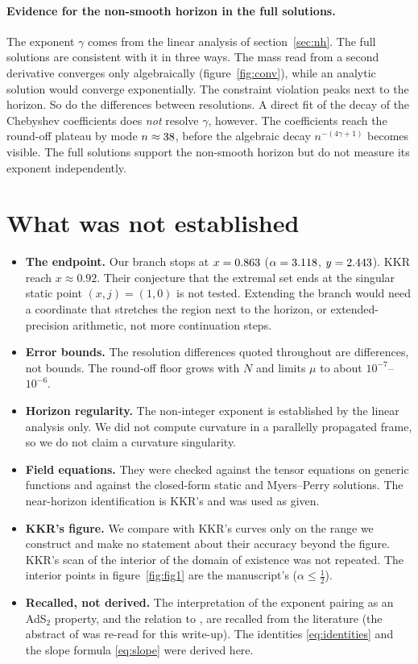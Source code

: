 \documentclass[11pt,a4paper]{article}
\begin{document}
\paragraph{Evidence for the non-smooth horizon in the full solutions.} The
exponent $\gamma$ comes from the linear analysis of section~\ref{sec:nh}. The full
solutions are consistent with it in three ways. The mass read from a second
derivative converges only algebraically (figure~\ref{fig:conv}), while an
analytic solution would converge exponentially. The constraint violation peaks
next to the horizon. So do the differences between resolutions. A direct fit of
the decay of the Chebyshev coefficients does \emph{not} resolve $\gamma$, however.
The coefficients reach the round-off plateau by mode $n\approx38$, before
the algebraic decay $n^{-(4\gamma+1)}$ becomes visible. The full solutions
support the non-smooth horizon but do not measure its exponent independently.

\section{What was not established}
\label{sec:limits}

\begin{itemize}
\item \textbf{The endpoint.} Our branch stops at $x=0.863$ ($\alpha=3.118$,
$y=2.443$). KKR reach $x\approx0.92$. Their conjecture that the extremal set ends
at the singular static point $(x,j)=(1,0)$ is not tested. Extending the branch
would need a coordinate that stretches the region next to the horizon, or
extended-precision arithmetic, not more continuation steps.
\item \textbf{Error bounds.} The resolution differences quoted throughout are
differences, not bounds. The round-off floor grows with $N$ and limits $\mu$ to
about $10^{-7}$--$10^{-6}$.
\item \textbf{Horizon regularity.} The non-integer exponent is established by the
linear analysis only. We did not compute curvature in a parallelly propagated
frame, so we do not claim a curvature singularity.
\item \textbf{Field equations.} They were checked against the tensor equations on
generic functions and against the closed-form static and Myers--Perry solutions.
The near-horizon identification is KKR's and was used as given.
\item \textbf{KKR's figure.} We compare with KKR's curves only on the range we
construct and make no statement about their accuracy beyond the figure. KKR's
scan of the interior of the domain of existence was not repeated. The interior
points in figure~\ref{fig:fig1} are the manuscript's ($\alpha\le\tfrac12$).
\item \textbf{Recalled, not derived.} The interpretation of the exponent pairing
as an AdS$_2$ property, and the relation to \cite{HKRS2023}, are recalled from the
literature (the abstract of \cite{HKRS2023} was re-read for this write-up). The
identities \eqref{eq:identities} and the slope formula \eqref{eq:slope} were
derived here.
\end{itemize}
\end{document}
